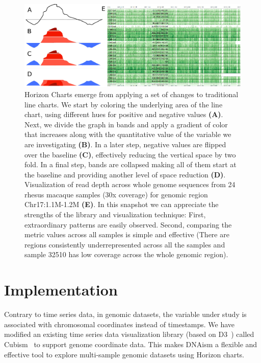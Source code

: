 \documentclass{bioinfo}
\begin{document}
\begin{figure}
\centerline{\includegraphics{figure.pdf}}
\caption{
Horizon Charts emerge from applying a set of changes to
traditional line charts. We start by coloring the underlying area of the line
chart, using different hues for positive and negative values \textbf{(A)}. Next, we
divide the graph in bands and apply a gradient of color that increases along
with the quantitative value of the variable we are investigating \textbf{(B)}. In a later
step, negative values are flipped over the baseline \textbf{(C)}, effectively
reducing the vertical space by two fold. In a final step, bands are collapsed
making all of them start at the baseline and providing another level of space
reduction \textbf{(D)}.  Visualization of read depth across whole genome sequences from
24 rhesus macaque samples (30x coverage) for genomic region Chr17:1.1M-1.2M
\textbf{(E)}. In this snapshot we can appreciate the strengths of the library and
visualization technique: First, extraordinary patterns are easily observed.
Second, comparing the metric values across all samples is simple and
effective (There are regions consistently underrepresented across all the
samples and sample 32510 has low coverage across the whole genomic region).
}\label{fig:01}
\end{figure}



\section{Implementation}

Contrary to time series data, in genomic datasets, the variable under study is
associated with chromosomal coordinates instead of timestamps. We have modified
an existing time series data visualization library (based on D3~\citep{2011-d3})
called Cubism~\citep{cubism} to support genome coordinate data. This makes DNAism
a flexible and effective tool to explore multi-sample genomic datasets using
Horizon charts.
\end{document}
